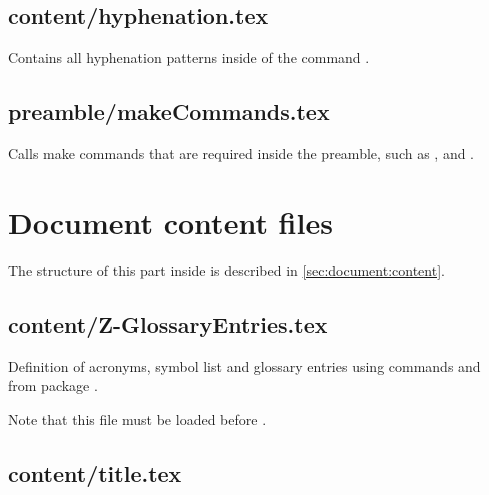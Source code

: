 \section{content/hyphenation.tex}

Contains all hyphenation patterns inside of the command .


\section{preamble/makeCommands.tex}

Calls make commands that are required inside the preamble, such as 
,  and .


\chapter{Document content files}

The structure of this part inside  is described in  \vref{sec:document:content}.

\section{content/Z-GlossaryEntries.tex}

Definition of acronyms, symbol list and glossary entries using commands   and  from package .

Note that this file must be loaded before .


\section{content/title.tex}

